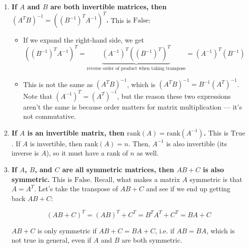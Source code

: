 \documentclass[11pt]{article}
\begin{document}
\begin{prob}
\begin{subprob}
\begin{solution}
\begin{enumerate}
    \item \textbf{If $A$ and $B$ are both invertible matrices, then $(A^TB)^{-1} = \left( (B^{-1})^T A^{-1} \right)^T$.} This is $\boxed{\text{False}}$:
    \begin{itemize}
        \item If we expand the right-hand side, we get
        $$((B^{-1})^T A^{-1})^T = \underbrace{(A^{-1})^T ((B^{-1})^T)^T}_{\text{reverse order of product when taking transpose}} = (A^{-1})^T (B^{-1})$$
        \item This is not the same as $(A^TB)^{-1}$, which is $(A^TB)^{-1} = B^{-1}(A^T)^{-1}$. Note that $(A^{-1})^T = (A^T)^{-1}$, but the reason these two expressions aren't the same is because order matters for matrix multiplication --- it's not commutative.
    \end{itemize}
    \item \textbf{If $A$ is an invertible matrix, then $\text{rank}(A) = \text{rank}(A^{-1})$.} This is $\boxed{\text{True}}$. If $A$ is invertible, then $\text{rank}(A) = n$. Then, $A^{-1}$ is also invertible (its inverse is $A$), so it must have a rank of $n$ as well.
    \item \textbf{If $A$, $B$, and $C$ are all symmetric matrices, then $AB + C$ is also symmetric.} This is $\boxed{\text{False}}$. Recall, what makes a matrix $A$ symmetric is that $A = A^T$. Let's take the transpose of $AB + C$ and see if we end up getting back $AB + C$:
    
    $$(AB + C)^T = (AB)^T + C^T = B^TA^T + C^T = BA + C$$

    $AB + C$ is only symmetric if $AB + C = BA + C$, i.e. if $AB = BA$, which is not true in general, even if $A$ and $B$ are both symmetric. 
    
\end{enumerate}
\end{solution}
\end{subprob}

\end{prob}

\newpage

\end{document}
